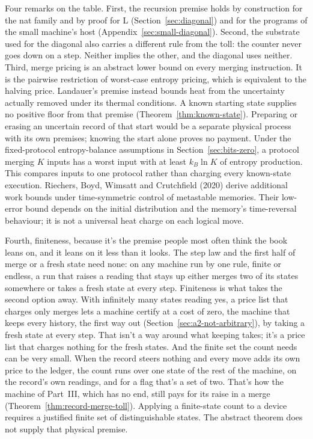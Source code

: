 \documentclass[11pt,twoside]{article}
\theoremstyle{thielethm}
\theoremstyle{thieledef}
\theoremstyle{thieledef}
\theoremstyle{thieledef}
\theoremstyle{thielethm}
\theoremstyle{thieleobs}
\theoremstyle{thielethm}
\begin{document}
Four remarks on the table. First, the recursion premise holds by construction for the nat
family and by proof for L (Section~\ref{sec:diagonal}) and for the programs of the small machine's
host (Appendix~\ref{sec:small-diagonal}).
Second, the substrate used for the diagonal also carries a different rule from the toll: the counter
never goes down on a step. Neither implies the other, and the diagonal uses neither. Third, merge pricing is an abstract lower bound on every merging instruction.
It is the pairwise restriction of worst-case entropy pricing, which is equivalent
to the halving price. Landauer's premise instead bounds heat from the uncertainty
actually removed under its thermal conditions. A known starting state supplies no
positive floor from that premise (Theorem~\ref{thm:known-state}). Preparing or erasing an uncertain record of that start would be a separate
physical process with its own premises; knowing the start alone proves no
payment. Under the fixed-protocol entropy-balance assumptions in
Section~\ref{sec:bits-zero}, a protocol merging $K$ inputs has a worst input
with at least $k_B\ln K$ of entropy production. This compares inputs to
one protocol rather than charging every known-state execution. Riechers, Boyd, Wimsatt and Crutchfield (2020) derive additional work bounds under
time-symmetric control of metastable memories. Their low-error bound depends on the
initial distribution and the memory's time-reversal behaviour; it is not a universal
heat charge on each logical move.

Fourth, finiteness, because it's the premise people most often think the book leans on, and it
leans on it less than it looks. The step law and the first half of merge or a fresh state need none: on any machine run by one rule, finite or endless, a run that raises a reading that stays up either merges two of its
states somewhere or takes a fresh state at every step. Finiteness is what takes the second option away. With infinitely many
states reading yes, a price list that charges only merges lets a machine certify at a cost of zero,
the machine that keeps every history, the first way out (Section~\ref{sec:a2-not-arbitrary}), by taking a fresh state at every step. That
isn't a way around what keeping takes; it's a price list that charges nothing for the fresh states. And the finite set the count needs can be very small. When the record steers nothing and every move adds its own price to the ledger, the count runs over one state of the rest of the machine, on the record's own readings, and for a flag that's a set of two. That's how the machine of Part~III, which has no end, still pays for its raise in a merge (Theorem~\ref{thm:record-merge-toll}). Applying a finite-state count to a device requires a justified finite set of distinguishable states. The abstract theorem does not supply that physical premise.
\end{document}
